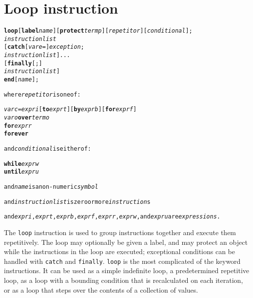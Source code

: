 \chapter{Loop instruction}\label{refloop}
\index{,}
\index{,}
\index{,}
\index{,}
\begin{shaded}
\begin{alltt}
\textbf{loop} [\textbf{label} \emph{name}] [\textbf{protect} \emph{termp}] [\emph{repetitor}] [\emph{conditional}];
        \emph{instructionlist}
    [\textbf{catch} [\emph{vare} =] \emph{exception};
        \emph{instructionlist}]...
    [\textbf{finally}[;]
        \emph{instructionlist}]
    \textbf{end} [\emph{name}];

where \emph{repetitor} is one of:

    \emph{varc} = \emph{expri} [\textbf{to} \emph{exprt}] [\textbf{by} \emph{exprb}] [\textbf{for} \emph{exprf}]
    \emph{varo} \textbf{over} \emph{termo}
    \textbf{for} \emph{exprr}
    \textbf{forever}

and \emph{conditional} is either of:

    \textbf{while} \emph{exprw}
    \textbf{until} \emph{expru}

and \emph{name} is a non-numeric \emph{symbol}

and \emph{instructionlist} is zero or more \emph{instruction}s

and \emph{expri}, \emph{exprt}, \emph{exprb}, \emph{exprf}, \emph{exprr}, \emph{exprw}, and \emph{expru} are \emph{expressions}.
\end{alltt}
\end{shaded}
 The \texttt{loop} instruction is used to group instructions together
and execute them repetitively.
The loop may optionally be given a label, and may protect an object
while the instructions in the loop are executed; exceptional conditions
can be handled with \texttt{catch} and \texttt{finally}.
 \texttt{loop} is the most complicated of the \nr{} keyword
instructions.
It can be used as a simple indefinite loop, a predetermined
repetitive loop, as a loop with a bounding condition that is
recalculated on each iteration, or as a loop that steps over the
contents of a collection of values.
